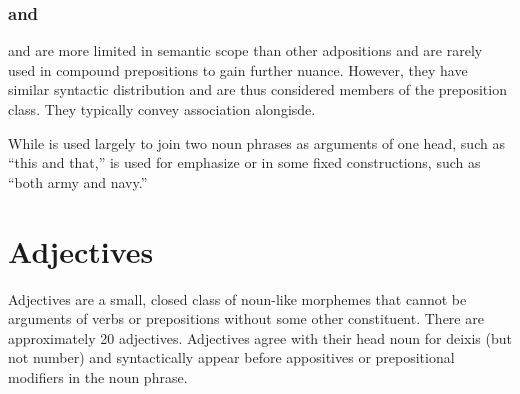 \subsection{ and } \label{subsec:u_and_su}
 and  are more limited in semantic scope than other adpositions and are rarely used in compound prepositions to gain further nuance. However, they have similar syntactic distribution and are thus considered members of the preposition class. They typically convey association alongisde.

While  is used largely to join two noun phrases as arguments of one head, such as  “this and that,”  is used for emphasize or in some fixed constructions, such as  “both army and navy.”




\setchapterpreamble[u]{\margintoc}
\chapter{Adjectives}
Adjectives are a small, closed class of noun-like morphemes that cannot be arguments of verbs or prepositions without some other constituent. There are approximately 20 adjectives. Adjectives agree with their head noun for deixis (but not number) and syntactically appear before appositives or prepositional modifiers in the noun phrase.

